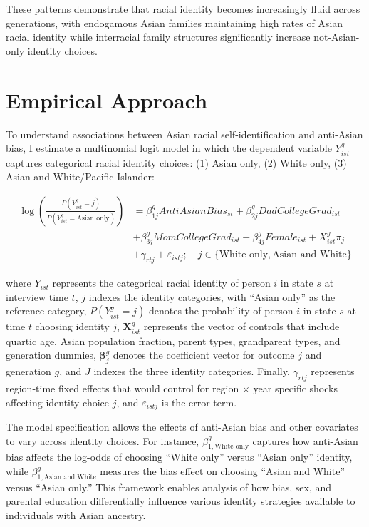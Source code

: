 These patterns demonstrate that racial identity becomes increasingly fluid across generations, with endogamous Asian families maintaining high rates of Asian racial identity while interracial family structures significantly increase not-Asian-only identity choices.

\section{Empirical Approach}\label{sec:empstrat}

To understand associations between Asian racial self-identification and anti-Asian bias, I estimate a multinomial logit model in which the dependent variable $Y_{ist}^g$ captures categorical racial identity choices: (1) Asian only, (2) White only, (3) Asian and White/Pacific Islander:

\begin{align}
\log\left(\frac{P(Y_{ist}^g = j)}{P(Y_{ist}^g = \text{Asian only})}\right) &= \beta_{1j}^g AntiAsianBias_{st} + \beta_{2j}^g DadCollegeGrad_{ist}\nonumber \\ 
& + \beta_{3j}^g MomCollegeGrad_{ist} + \beta_{4j}^g Female_{ist} + X_{ist}^g\pi_j  \nonumber \\ 
& + \gamma_{rtj} + \varepsilon_{istj}; \quad j \in \{\text{White only}, \text{Asian and White}\} \label{eq:multinomial_logit}
\end{align}

where $Y_{ist}$ represents the categorical racial identity of person $i$ in state $s$ at interview time $t$, $j$ indexes the identity categories, with ``Asian only'' as the reference category, $P(Y_{ist}^g = j)$ denotes the probability of person $i$ in state $s$ at time $t$ choosing identity $j$, $\mathbf{X}_{ist}^g$ represents the vector of controls that include quartic age, Asian population fraction, parent types, grandparent types, and generation dummies, $\boldsymbol{\beta}_j^g$ denotes the coefficient vector for outcome $j$ and generation $g$, and $J$ indexes the three identity categories. Finally, $\gamma_{rtj}$ represents region-time fixed effects that would control for region $\times$ year specific shocks affecting identity choice $j$, and $\varepsilon_{istj}$ is the error term.

The model specification allows the effects of anti-Asian bias and other covariates to vary across identity choices. For instance, $\beta_{1,\text{White only}}^g$ captures how anti-Asian bias affects the log-odds of choosing ``White only'' versus ``Asian only'' identity, while $\beta_{1,\text{Asian and White}}^g$ measures the bias effect on choosing ``Asian and White'' versus ``Asian only.'' This framework enables analysis of how bias, sex, and parental education differentially influence various identity strategies available to individuals with Asian ancestry.

